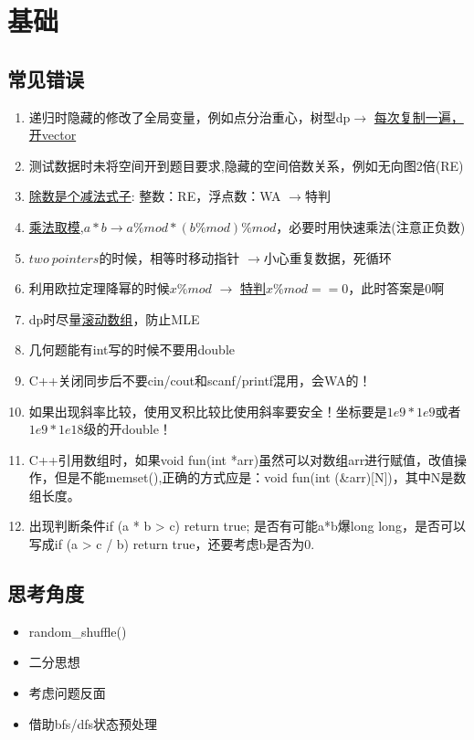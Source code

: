 %
%

\chapter{基础}
\setcounter{page}{1} %

\section{常见错误}
\begin{enumerate}
\item 递归时隐藏的修改了全局变量，例如点分治重心，树型dp$\rightarrow$ \underline{每次复制一遍，开vector}
\item 测试数据时未将空间开到题目要求,隐藏的空间倍数关系，例如无向图2倍(RE)
\item \underline{除数是个减法式子}: 整数：RE，浮点数：WA $\rightarrow$特判
\item \underline{乘法取模},$a*b \rightarrow a\% mod*(b\% mod)\% mod$，必要时用快速乘法(注意正负数)
\item $two\  pointers$的时候，相等时移动指针 $\rightarrow$小心重复数据，死循环
\item 利用欧拉定理降幂的时候$x\% mod$ $\rightarrow$ \underline{特判$x\% mod==0$}，此时答案是0啊
\item dp时尽量\underline{滚动数组}，防止MLE
\item 几何题能有int写的时候不要用double
\item C++关闭同步后不要cin/cout和scanf/printf混用，会WA的！
\item 如果出现斜率比较，使用叉积比较比使用斜率要安全！坐标要是$1e9*1e9$或者$1e9*1e18$级的开double！
\item C++引用数组时，如果void fun(int *arr)虽然可以对数组arr进行赋值，改值操作，但是不能memset(),正确的方式应是：void fun(int (\&arr)[N])，其中N是数组长度。
\item 出现判断条件if (a * b > c) return true; 是否有可能a*b爆long long，是否可以写成if (a > c / b) return true，还要考虑b是否为0.
\end{enumerate}

\section{思考角度}
\begin{itemize}
\item \large{random\_shuffle()}
\item 二分思想
\item 考虑问题反面
\item 借助bfs/dfs状态预处理
\end{itemize}

